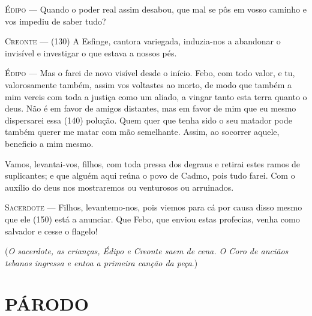 \textsc{Édipo} --- Quando o poder real assim desabou, que mal se pôs em vosso caminho e vos
impediu de saber tudo?

\textsc{Creonte} --- (130) A Esfinge, cantora variegada, induzia-nos a abandonar o invisível
e investigar o que estava a nossos pés.

\textsc{Édipo} --- Mas o farei de novo visível desde o início. Febo, com todo valor, e tu,
valorosamente também, assim vos voltastes ao morto, de modo que também a
mim vereis com toda a justiça como um aliado, a vingar tanto esta terra
quanto o deus. Não é em favor de amigos distantes, mas em favor de mim
que eu mesmo dispersarei essa (140) polução. Quem quer que tenha sido o
seu matador pode também querer me matar com mão semelhante. Assim, ao
socorrer aquele, beneficio a mim mesmo.

Vamos, levantai-vos, filhos, com toda pressa dos degraus e retirai estes
ramos de suplicantes; e que alguém aqui reúna o povo de Cadmo, pois tudo
farei. Com o auxílio do deus nos mostraremos ou venturosos ou
arruinados.

\textsc{Sacerdote} --- Filhos, levantemo-nos, pois viemos para cá por causa disso mesmo que ele
(150) está a anunciar. Que Febo, que enviou estas profecias, venha como
salvador e cesse o flagelo!

(\emph{O sacerdote, as crianças, Édipo e Creonte saem de cena. O Coro de
anciãos tebanos ingressa e entoa a primeira canção da peça}.)

\section{PÁRODO}

